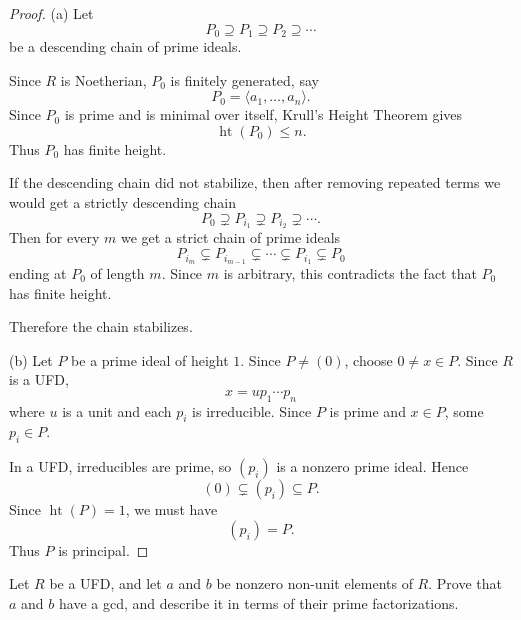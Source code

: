 \documentclass[addpoints,10pt]{exam}
\theoremstyle{plain}
\theoremstyle{definition}
\newtheorem{prob}[thm]{Problem}
\theoremstyle{plain}
\theoremstyle{plain}
\theoremstyle{definition}
\let\oldprob\prob
\let\endoldprob\endprob
\renewenvironment{prob}
  {\begin{singlespace}\oldprob}
  {\endoldprob\end{singlespace}}
\begin{document}
\begin{proof}
(a) Let
\[
P_0\supseteq P_1\supseteq P_2\supseteq\cdots
\]
be a descending chain of prime ideals.

Since $R$ is Noetherian, $P_0$ is finitely generated, say
\[
P_0=\langle a_1,\hdots,a_n\rangle.
\]
Since $P_0$ is prime and is minimal over itself, Krull's Height Theorem gives
\[
\operatorname{ht}(P_0)\leq n.
\]
Thus $P_0$ has finite height.

If the descending chain did not stabilize, then after removing repeated terms we would get a strictly descending chain
\[
P_0\supsetneq P_{i_1}\supsetneq P_{i_2}\supsetneq\cdots.
\]
Then for every $m$ we get a strict chain of prime ideals
\[
P_{i_m}\subsetneq P_{i_{m-1}}\subsetneq\cdots\subsetneq P_{i_1}\subsetneq P_0
\]
ending at $P_0$ of length $m$. Since $m$ is arbitrary, this contradicts the fact that $P_0$ has finite height.

Therefore the chain stabilizes.

(b) Let $P$ be a prime ideal of height $1$. Since $P\neq (0)$, choose $0\neq x\in P$. Since $R$ is a UFD,
\[
x=up_1\cdots p_n
\]
where $u$ is a unit and each $p_i$ is irreducible. Since $P$ is prime and $x\in P$, some $p_i\in P$.

In a UFD, irreducibles are prime, so $(p_i)$ is a nonzero prime ideal. Hence
\[
(0)\subsetneq (p_i)\subseteq P.
\]
Since $\operatorname{ht}(P)=1$, we must have
\[
(p_i)=P.
\]
Thus $P$ is principal.
\end{proof}

\newpage
\setcounter{thm}{0} %
\begin{prob}
Let $R$ be a UFD, and let $a$ and $b$ be nonzero non-unit elements of $R$.
Prove that $a$ and $b$ have a gcd, and describe it in terms of their prime factorizations.
\end{prob}
\end{document}
